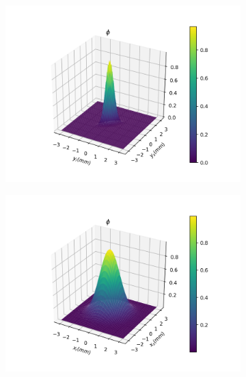 \documentclass{book}
\begin{document}
\begin{figure}[H]
\centering
\begin{subfigure}[b]{0.45\linewidth}
\includegraphics[width=\linewidth]{images/SPDC_yy.png}
\end{subfigure}
\begin{subfigure}[b]{0.45\linewidth}
\includegraphics[width=\linewidth]{images/SPDC_xx.png}
\end{subfigure}
\begin{subfigure}[b]{0.45\linewidth}

\end{subfigure}
\end{figure}
\end{document}
